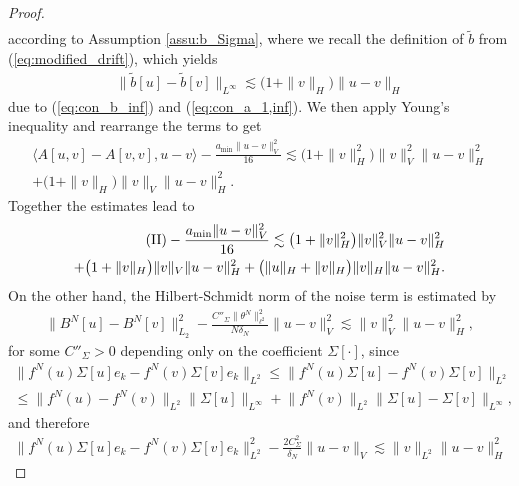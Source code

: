 \begin{proof}
\begin{align*}
\end{align*}
according to Assumption \ref{assu:b_Sigma}, 
where we recall the definition of $\tilde{b}$ from (\ref{eq:modified_drift}), which yields
\begin{align*}
    \|\tilde{b}[u] - \tilde{b}[v]\|_{L^{\infty}} \lesssim\big(1 + \|v\|_H\big)\|u-v\|_{H}
\end{align*}
due to (\ref{eq:con_b_inf}) and (\ref{eq:con_a_1,inf}). We then apply Young's inequality and rearrange the terms to get
\begin{align*}
\big\langle A[u,v] - A[v,v], u - v\big\rangle - \frac{a_{\min} \|u - v\|_{V}^2}{16}
    \lesssim  \big(1 + \|v\|^2_{H}\big)\|v\|^2_V\|u - v\|^2_{H} \\
    +   \big(1 + \|v\|_{H}\big)\|v\|_V\|u - v\|^2_{H}.
\end{align*}
Together the estimates lead to 
\begin{equation}\label{eq:loc_mon_II}
\begin{split}
     (\rom{2}) 
 - \frac{a_{\min} \|u - v\|_{V}^2}{16} \lesssim  \big(1 + \|v\|^2_{H}\big)\|v\|^2_V\|u - v\|^2_{H} \\
    +   \big(1 + \|v\|_{H}\big)\|v\|_V\|u - v\|^2_{H} + \big(\|u\|_{H} + \|v\|_{H}\big)\|v\|_H\|u - v\|^2_H.
    \end{split}
\end{equation}
On the other hand, the Hilbert-Schmidt norm of the noise term is estimated by 
\begin{equation}\label{eq:noise_diff_bound}
\begin{split}
 \big\|B^N[u] - B^N[v]\big\|_{L_2}^2 - \frac{C''_{\Sigma}\|\theta^N\|^2_{\ell^2}}{N\delta_N}\|u-v\|_{V}^2 \lesssim  \|v\|_V^2\|u-v\|_{H}^2,
\end{split}
\end{equation}
for some $C''_{\Sigma} > 0$ depending only on the coefficient $\Sigma[\cdot]$, since 
\begin{equation*}
\begin{split}
\big\|f^N(u)\Sigma [u]e_k - f^N(v)\Sigma [v]e_k\big\|_{L^2} \leq \big\|f^N(u)\Sigma [u]- f^N(v)\Sigma [v]\big\|_{L^2}\\
\leq \big\|f^N(u) -f^N(v)\big\|_{L^{2}}\|\Sigma[u]\|_{L^{\infty}}
  +  \big\|f^N(v)\big\|_{L^{2}}\|\Sigma[u] - \Sigma[v]\|_{L^{\infty}},
\end{split}
\end{equation*}
and therefore
\begin{align*}
    \big\|f^N(u)\Sigma [u]e_k - f^N(v)\Sigma [v]e_k\big\|^2_{L^2} - \frac{2C^2_{\Sigma}}{\delta_N}\|u-v\|_{V} \lesssim \|v\|_{L^2}\|u-v\|^2_{H}

\end{align*}
\end{proof}
